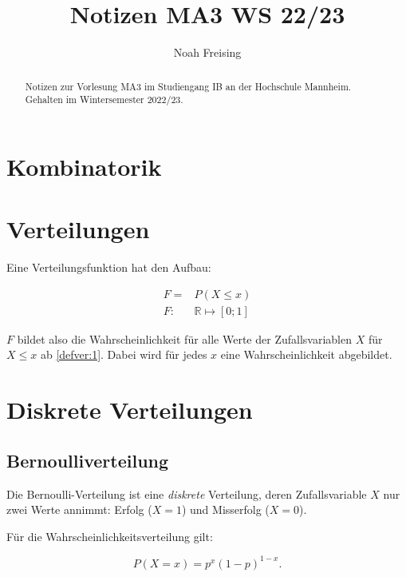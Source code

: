 \documentclass{tufte-handout}
\title{Notizen MA3 WS 22/23}
\author[Noah Freising]{Noah Freising}
\theoremstyle{own}
\begin{document}
\maketitle%

\begin{abstract}
\noindent
Notizen zur Vorlesung MA3 im Studiengang IB an der Hochschule Mannheim. Gehalten im Wintersemester 2022/23.
\end{abstract}

{\small\tableofcontents}


\section{Kombinatorik}

\section{Verteilungen}

Eine Verteilungsfunktion hat den Aufbau:

\begin{align}
F = & P(X \leq x) \label{defver:1} \\ 
F  :&  \mathbb{R} \mapsto [0;1] \label{defver:2}
\end{align}

$F$ bildet also die Wahrscheinlichkeit für alle Werte der Zufallsvariablen $X$ für $X \leq x$ ab \eqref{defver:1}. Dabei wird für jedes $x$ eine Wahrscheinlichkeit abgebildet.

\section{Diskrete Verteilungen}

\subsection{Bernoulliverteilung}

Die Bernoulli-Verteilung ist eine \emph{diskrete} Verteilung, deren Zufallsvariable $X$ nur zwei Werte annimmt: Erfolg ($X=1$) und Misserfolg ($X=0$).

Für die Wahrscheinlichkeitsverteilung gilt:

\begin{equation}
	P(X=x) = p^x (1-p)^{1-x}.
\end{equation}
\end{document}
